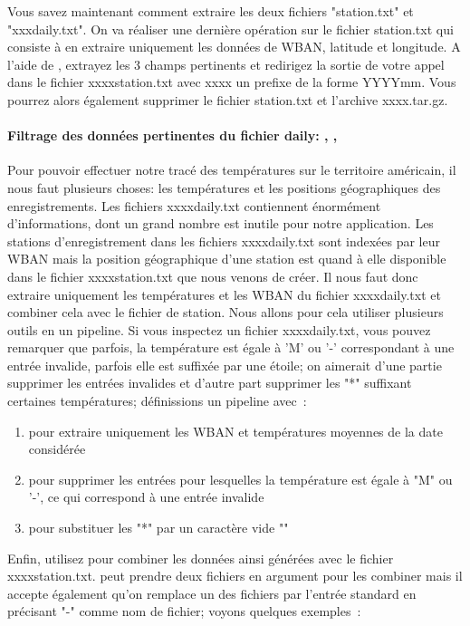 Vous savez maintenant comment extraire les deux fichiers "station.txt" et "xxxdaily.txt". On va réaliser une dernière opération sur le fichier station.txt qui consiste à en extraire uniquement les données de WBAN, latitude et longitude. A l'aide de \awk, extrayez les 3 champs pertinents et redirigez la sortie de votre appel \awk dans le fichier xxxxstation.txt avec xxxx un prefixe de la forme YYYYmm. Vous pourrez alors également supprimer le fichier station.txt et l'archive xxxx.tar.gz.

\paragraph{Filtrage des données pertinentes du fichier daily: \awk, \sed, \join}

Pour pouvoir effectuer notre tracé des températures sur le territoire américain, il nous faut plusieurs choses: les températures et les positions géographiques des enregistrements. Les fichiers xxxxdaily.txt contiennent énormément d'informations, dont un grand nombre est inutile pour notre application. Les stations d'enregistrement dans les fichiers xxxxdaily.txt sont indexées par leur WBAN mais la position géographique d'une station est quand à elle disponible dans le fichier xxxxstation.txt que nous venons de créer. Il nous faut donc extraire uniquement les températures et les WBAN du fichier xxxxdaily.txt et combiner cela avec le fichier de station. Nous allons pour cela utiliser plusieurs outils en un pipeline. Si vous inspectez un fichier xxxxdaily.txt, vous pouvez remarquer que parfois, la température est égale à 'M' ou '-' correspondant à une entrée invalide, parfois elle est suffixée par une étoile; on aimerait d'une partie supprimer les entrées invalides et d'autre part supprimer les "*" suffixant certaines températures; définissions un pipeline avec~:
\begin{enumerate}
\item \awk pour extraire uniquement les WBAN et températures moyennes de la date considérée
\item \awk pour supprimer les entrées pour lesquelles la température est égale à "M" ou '-', ce qui correspond à une entrée invalide
\item \sed pour substituer les "*" par un caractère vide ""
\end{enumerate}
Enfin, utilisez \join pour combiner les données ainsi générées avec le fichier xxxxstation.txt. \join peut prendre deux fichiers en argument pour les combiner mais il accepte également qu'on remplace un des fichiers par l'entrée standard en précisant "-" comme nom de fichier; voyons quelques exemples~:

